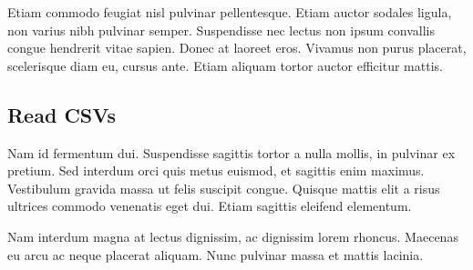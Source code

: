 \documentclass[sigconf]{acmart}
\begin{document}
Etiam commodo feugiat nisl pulvinar pellentesque. Etiam auctor sodales
ligula, non varius nibh pulvinar semper. Suspendisse nec lectus non
ipsum convallis congue hendrerit vitae sapien. Donec at laoreet
eros. Vivamus non purus placerat, scelerisque diam eu, cursus
ante. Etiam aliquam tortor auctor efficitur mattis.

\subsection{Read CSVs}

Nam id fermentum dui. Suspendisse sagittis tortor a nulla mollis, in
pulvinar ex pretium. Sed interdum orci quis metus euismod, et sagittis
enim maximus. Vestibulum gravida massa ut felis suscipit
congue. Quisque mattis elit a risus ultrices commodo venenatis eget
dui. Etiam sagittis eleifend elementum.

Nam interdum magna at lectus dignissim, ac dignissim lorem
rhoncus. Maecenas eu arcu ac neque placerat aliquam. Nunc pulvinar
massa et mattis lacinia.
\end{document}

